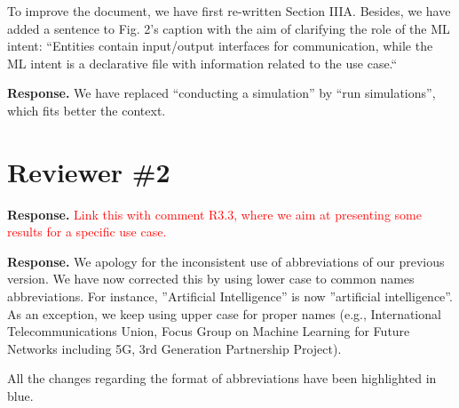 \documentclass[a4paper,twoside,11pt]{reviewresponse}
\begin{document}
	To improve the document, we have first re-written Section IIIA. Besides, we have added a sentence to Fig. 2's caption with the aim of clarifying the role of the ML intent: “Entities contain input/output interfaces for communication, while the ML intent is a declarative file with information related to the use case.“
	
	
	\textbf{Response.} We have replaced “conducting a simulation” by “run simulations”,  which fits better the context.
	
	\section{Reviewer \#2}
	
	
	\textbf{Response.} \textcolor{red}{Link this with comment R3.3, where we aim at presenting some results for a specific use case.}
	
	
	
	\textbf{Response.} We apology for the inconsistent use of abbreviations of our previous version. We have now corrected this by using lower case to common names abbreviations. For instance, ”Artificial Intelligence” is now ”artificial intelligence”. As an exception, we keep using upper case for proper names (e.g., International Telecommunications Union, Focus Group on Machine Learning for Future Networks including 5G, 3rd Generation Partnership Project).
	
	All the changes regarding the format of abbreviations have been highlighted in blue.
	
\end{document}
